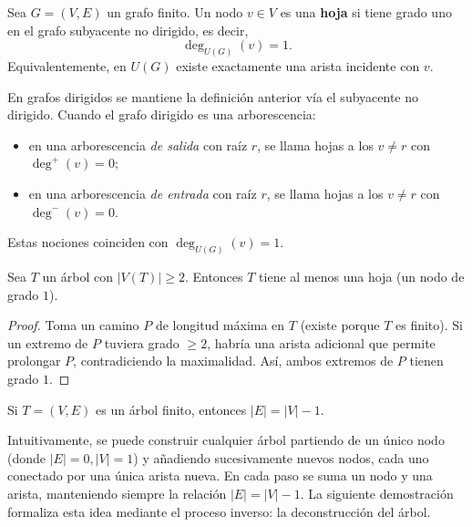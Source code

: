             \begin{definicion}[Hoja]
                Sea $G=(V,E)$ un grafo finito. Un nodo $v\in V$ es una \textbf{hoja} si tiene grado uno en el grafo subyacente no dirigido, es decir,
                \[
                \deg_{U(G)}(v)=1.
                \]
                Equivalentemente, en $U(G)$ existe exactamente una arista incidente con $v$.
            \end{definicion}

            \begin{observacion}
                En grafos dirigidos se mantiene la definición anterior vía el subyacente no dirigido.
                Cuando el grafo dirigido es una arborescencia:
                \begin{itemize}
                  \item en una arborescencia \emph{de salida} con raíz $r$, se llama hojas a los $v\neq r$ con $\deg^{+}(v)=0$;
                  \item en una arborescencia \emph{de entrada} con raíz $r$, se llama hojas a los $v\neq r$ con $\deg^{-}(v)=0$.
                \end{itemize}
                Estas nociones coinciden con $\deg_{U(G)}(v)=1$.
            \end{observacion}

            \begin{lema}
                Sea $T$ un árbol con $|V(T)|\ge 2$. Entonces $T$ tiene al menos una hoja (un nodo de grado $1$).
            \end{lema}

            \begin{proof}
                Toma un camino $P$ de longitud máxima en $T$ (existe porque $T$ es finito). Si un extremo de $P$ tuviera grado $\ge 2$, habría una arista adicional que permite prolongar $P$, contradiciendo la maximalidad. Así, ambos extremos de $P$ tienen grado $1$.
            \end{proof}

            \begin{proposicion}
                Si $T=(V,E)$ es un árbol finito, entonces $|E|=|V|-1$.
            \end{proposicion}

            Intuitivamente, se puede construir cualquier árbol partiendo de un único nodo (donde $|E|=0, |V|=1$) y añadiendo sucesivamente nuevos nodos, cada uno conectado por una única arista nueva. En cada paso se suma un nodo y una arista, manteniendo siempre la relación $|E| = |V|-1$. La siguiente demostración formaliza esta idea mediante el proceso inverso: la deconstrucción del árbol.

